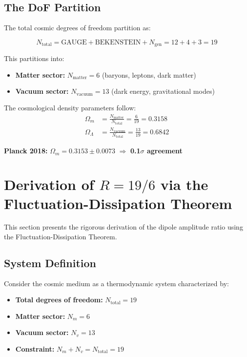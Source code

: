 \documentclass[12pt,a4paper]{article}
\begin{document}
\subsection{The DoF Partition}

The total cosmic degrees of freedom partition as:

\begin{equation}
N_{\text{total}} = \text{GAUGE} + \text{BEKENSTEIN} + N_{\text{gen}} = 12 + 4 + 3 = 19
\end{equation}

This partitions into:
\begin{itemize}
    \item \textbf{Matter sector:} $N_{\text{matter}} = 6$ (baryons, leptons, dark matter)
    \item \textbf{Vacuum sector:} $N_{\text{vacuum}} = 13$ (dark energy, gravitational modes)
\end{itemize}

The cosmological density parameters follow:
\begin{align}
\Omega_m &= \frac{N_{\text{matter}}}{N_{\text{total}}} = \frac{6}{19} = 0.3158 \\
\Omega_\Lambda &= \frac{N_{\text{vacuum}}}{N_{\text{total}}} = \frac{13}{19} = 0.6842
\end{align}

\textbf{Planck 2018:} $\Omega_m = 0.3153 \pm 0.0073$ $\Rightarrow$ \textbf{0.1$\sigma$ agreement}

\section{Derivation of $R = 19/6$ via the Fluctuation-Dissipation Theorem}

This section presents the rigorous derivation of the dipole amplitude ratio using the Fluctuation-Dissipation Theorem.

\subsection{System Definition}

Consider the cosmic medium as a thermodynamic system characterized by:

\begin{itemize}
    \item \textbf{Total degrees of freedom:} $N_{\text{total}} = 19$
    \item \textbf{Matter sector:} $N_m = 6$
    \item \textbf{Vacuum sector:} $N_v = 13$
    \item \textbf{Constraint:} $N_m + N_v = N_{\text{total}} = 19$
\end{itemize}
\end{document}
